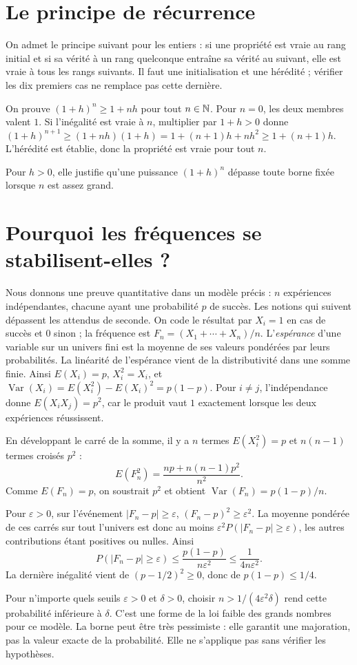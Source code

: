 \documentclass[../cours_2de.tex]{subfiles}
\begin{document}
\section{Le principe de récurrence}
\approfondissement On admet le principe suivant pour les entiers : si une propriété est vraie au rang initial et si sa vérité à un rang quelconque entraîne sa vérité au suivant, elle est vraie à tous les rangs suivants.
Il faut une initialisation et une hérédité ; vérifier les dix premiers cas ne remplace pas cette dernière.
\begin{demonstration}
On prouve $(1+h)^n\geq1+nh$ pour tout $n\in\mathbb{N}$.
Pour $n=0$, les deux membres valent $1$.
Si l'inégalité est vraie à $n$, multiplier par $1+h>0$ donne
$(1+h)^{n+1}\geq(1+nh)(1+h)
=1+(n+1)h+nh^2\geq1+(n+1)h$.
L'hérédité est établie, donc la propriété est vraie pour tout $n$.
\end{demonstration}
Pour $h>0$, elle justifie qu'une puissance $(1+h)^n$ dépasse toute borne fixée lorsque $n$ est assez grand.
\section{Pourquoi les fréquences se stabilisent-elles ?}
Nous donnons une preuve quantitative dans un modèle précis : $n$ expériences indépendantes, chacune ayant une probabilité $p$ de succès. Les notions qui suivent dépassent les attendus de seconde.
On code le résultat par $X_i=1$ en cas de succès et $0$ sinon ; la fréquence est
$F_n=(X_1+\cdots+X_n)/n$.
L'\emph{espérance} d'une variable sur un univers fini est la moyenne de ses valeurs pondérées par leurs probabilités. La linéarité de l'espérance vient de la distributivité dans une somme finie.
Ainsi $E(X_i)=p$, $X_i^2=X_i$, et
$\operatorname{Var}(X_i)=E(X_i^2)-E(X_i)^2=p(1-p)$.
Pour $i\ne j$, l'indépendance donne $E(X_iX_j)=p^2$, car le produit vaut $1$ exactement lorsque les deux expériences réussissent.
\begin{demonstration}
En développant le carré de la somme, il y a $n$ termes $E(X_i^2)=p$ et $n(n-1)$ termes croisés $p^2$ :
\[
 E(F_n^2)=\frac{np+n(n-1)p^2}{n^2}.
\]
Comme $E(F_n)=p$, on soustrait $p^2$ et obtient
$\operatorname{Var}(F_n)=p(1-p)/n$.
\end{demonstration}
\begin{demonstration}
Pour $\varepsilon>0$, sur l'événement $|F_n-p|\geq\varepsilon$,
$(F_n-p)^2\geq\varepsilon^2$.
La moyenne pondérée de ces carrés sur tout l'univers est donc au moins
$\varepsilon^2P(|F_n-p|\geq\varepsilon)$, les autres contributions étant positives ou nulles.
Ainsi
\[
P(|F_n-p|\geq\varepsilon)
\leq\frac{p(1-p)}{n\varepsilon^2}
\leq\frac1{4n\varepsilon^2}.
\]
La dernière inégalité vient de $(p-1/2)^2\geq0$, donc de $p(1-p)\leq1/4$.
\end{demonstration}
Pour n'importe quels seuils $\varepsilon>0$ et $\delta>0$, choisir
$n>1/(4\varepsilon^2\delta)$ rend cette probabilité inférieure à $\delta$.
C'est une forme de la loi faible des grands nombres pour ce modèle.
La borne peut être très pessimiste : elle garantit une majoration, pas la valeur exacte de la probabilité. Elle ne s'applique pas sans vérifier les hypothèses.
\end{document}
